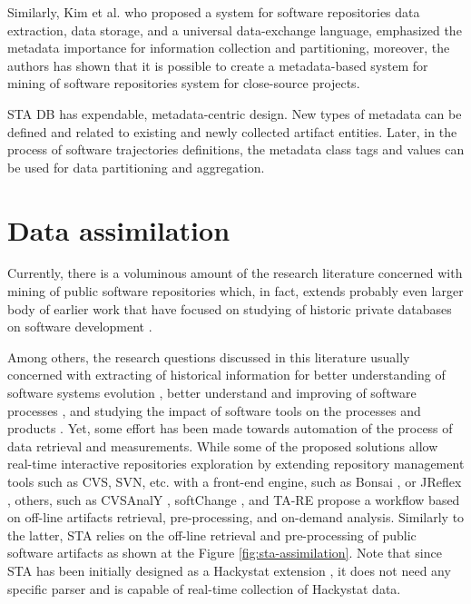 Similarly, Kim et al. \cite{citeulike:4000311} who proposed a system for software repositories data extraction, data storage, 
and a universal data-exchange language, emphasized the metadata importance for information collection and partitioning, moreover, 
the authors has shown that it is possible to create a metadata-based system for mining of software repositories system for 
close-source projects.

STA DB has expendable, metadata-centric design. New types of metadata can be defined and related to existing and newly collected
artifact entities. Later, in the process of software trajectories definitions, the metadata class tags and values can be used 
for data partitioning and aggregation.

\section{Data assimilation}
Currently, there is a voluminous amount of the research literature concerned with mining of public software repositories 
\cite{citeulike:2710928} which, in fact, extends probably even larger body of earlier work that have focused on studying 
of historic private databases on software development \cite{citeulike:393158} \cite{citeulike:13125375} \cite{citeulike:13125481}.

Among others, the research questions discussed in this literature usually concerned with extracting of 
historical information for better understanding of software systems evolution \cite{citeulike:277045} \cite{citeulike:4000311}, 
better understand and improving of software processes \cite{citeulike:5803126}, 
and studying the impact of software tools on the processes and products \cite{citeulike:13125389}. 
Yet, some effort has been made towards automation of the process of data retrieval and measurements. 
While some of the proposed solutions allow real-time interactive repositories exploration by extending 
repository management tools such as CVS, SVN, etc. with a front-end engine, such as Bonsai \cite{bonsai},
or JReflex \cite{citeulike:3017440}, others, such as CVSAnalY \cite{citeulike:6544724}, softChange \cite{citeulike:13125395},
and {TA}-{RE} \cite{citeulike:4000311} propose a workflow based on off-line artifacts retrieval, 
pre-processing, and on-demand analysis.
Similarly to the latter, STA relies on the off-line retrieval and pre-processing of public software artifacts as
shown at the Figure \ref{fig:sta-assimilation}. Note that since STA has been initially designed as a Hackystat 
extension \cite{csdl2-10-09}, it does not need any specific parser and is capable of real-time 
collection of Hackystat data.

